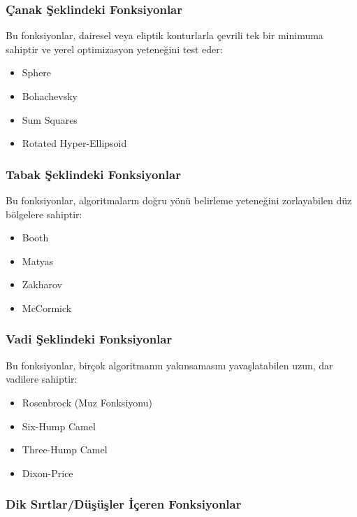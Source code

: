 \subsubsection{Çanak Şeklindeki Fonksiyonlar}

Bu fonksiyonlar, dairesel veya eliptik konturlarla çevrili tek bir minimuma sahiptir ve yerel optimizasyon yeteneğini test eder:

\begin{itemize}
    \item Sphere
    \item Bohachevsky
    \item Sum Squares
    \item Rotated Hyper-Ellipsoid
\end{itemize}

\subsubsection{Tabak Şeklindeki Fonksiyonlar}

Bu fonksiyonlar, algoritmaların doğru yönü belirleme yeteneğini zorlayabilen düz bölgelere sahiptir:

\begin{itemize}
    \item Booth
    \item Matyas
    \item Zakharov
    \item McCormick
\end{itemize}

\subsubsection{Vadi Şeklindeki Fonksiyonlar}

Bu fonksiyonlar, birçok algoritmanın yakınsamasını yavaşlatabilen uzun, dar vadilere sahiptir:

\begin{itemize}
    \item Rosenbrock (Muz Fonksiyonu)
    \item Six-Hump Camel
    \item Three-Hump Camel
    \item Dixon-Price
\end{itemize}

\subsubsection{Dik Sırtlar/Düşüşler İçeren Fonksiyonlar}

